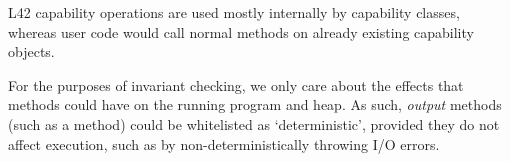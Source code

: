 \noindent L42 capability operations are used mostly internally by capability classes, whereas user code would call normal methods on already existing capability objects.

For the purposes of invariant checking, we only care about the effects that methods could have on the running program and heap. As such, \emph{output} methods (such as a \Q@print@ method) could be whitelisted as `deterministic', provided they do not affect execution, such as by non-deterministically throwing I/O errors.

